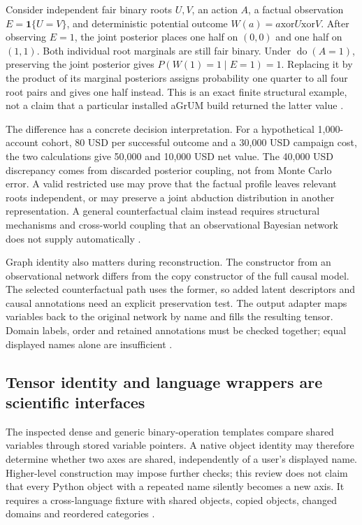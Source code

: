 Consider independent fair binary roots $U,V$, an action $A$, a factual
observation $E=\mathbf1\{U=V\}$, and deterministic potential outcome
$W(a)=a\mathbin{\mathrm{xor}}U\mathbin{\mathrm{xor}}V$.
After observing $E=1$, the joint posterior places one half on $(0,0)$ and
one half on $(1,1)$. Both individual root marginals are still fair binary.
Under $\operatorname{do}(A=1)$, preserving the joint posterior gives
$P(W(1)=1\mid E=1)=1$. Replacing it by the product of its marginal
posteriors assigns probability one quarter to all four root pairs and gives
one half instead. This is an exact finite structural example, not a claim
that a particular installed aGrUM build returned the latter value
\citep{exec24_agrum_choice}.

The difference has a concrete decision interpretation. For a hypothetical
1,000-account cohort, 80 USD per successful outcome and a 30,000 USD
campaign cost, the two calculations give 50,000 and 10,000 USD net value.
The 40,000 USD discrepancy comes from discarded posterior coupling, not
from Monte Carlo error. A valid restricted use may prove that the factual
profile leaves relevant roots independent, or may preserve a joint
abduction distribution in another representation. A general counterfactual
claim instead requires structural mechanisms and cross-world coupling that
an observational Bayesian network does not supply automatically
\citep{exec24_agrum_choice}.

Graph identity also matters during reconstruction. The constructor from an
observational network differs from the copy constructor of the full causal
model. The selected counterfactual path uses the former, so added latent
descriptors and causal annotations need an explicit preservation test.
The output adapter maps variables back to the original network by name and
fills the resulting tensor. Domain labels, order and retained annotations
must be checked together; equal displayed names alone are insufficient
\citep{exec24_agrum_source}.

\subsection{Tensor identity and language wrappers are scientific interfaces}
The inspected dense and generic binary-operation templates compare shared
variables through stored variable pointers. A native object identity may
therefore determine whether two axes are shared, independently of a user's
displayed name. Higher-level construction may impose further checks; this
review does not claim that every Python object with a repeated name silently
becomes a new axis. It requires a cross-language fixture with shared objects,
copied objects, changed domains and reordered categories
\citep{exec24_agrum_source}.

